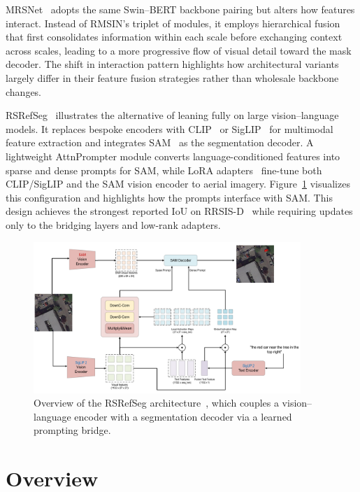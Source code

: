 MRSNet~\cite{yang2024large} adopts the same Swin–BERT backbone pairing but alters how features interact. Instead of RMSIN's triplet of modules, it employs hierarchical fusion that first consolidates information within each scale before exchanging context across scales, leading to a more progressive flow of visual detail toward the mask decoder. The shift in interaction pattern highlights how architectural variants largely differ in their feature fusion strategies rather than wholesale backbone changes.

RSRefSeg~\cite{chen2025rsrefseg} illustrates the alternative of leaning fully on large vision–language models. It replaces bespoke encoders with CLIP~\cite{clip} or SigLIP~\cite{siglip} for multimodal feature extraction and integrates SAM~\cite{sam} as the segmentation decoder. A lightweight AttnPrompter module converts language-conditioned features into sparse and dense prompts for SAM, while LoRA adapters~\cite{lora} fine-tune both CLIP/SigLIP and the SAM vision encoder to aerial imagery. Figure~\ref{fig:rsrefseg_architecture} visualizes this configuration and highlights how the prompts interface with SAM. This design achieves the strongest reported IoU on RRSIS-D~\cite{liu2024rotated,chen2025rsrefseg} while requiring updates only to the bridging layers and low-rank adapters.

\begin{figure}[t]
\centering
\includegraphics[width=0.9\textwidth]{Images/clipsam.png}
\caption{Overview of the RSRefSeg architecture~\cite{chen2025rsrefseg}, which couples a vision–language encoder with a segmentation decoder via a learned prompting bridge.}
\label{fig:rsrefseg_architecture}
\end{figure}

\section{Overview}

